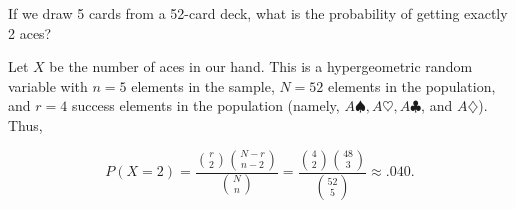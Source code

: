 \question If we draw 5 cards from a 52-card deck, what is the probability of
getting exactly 2 aces?


\begin{solution}
Let $X$ be the number of aces in our hand.  This is a hypergeometric random
variable with $n = 5$ elements in the sample, $N = 52$ elements in the
population, and $r = 4$ success elements in the population (namely,
$A\spadesuit, A\heartsuit, A\clubsuit$, and $A\diamondsuit$).  Thus,

\[
  P(X = 2)
    = \frac{\binom{r}{2} \binom{N - r}{n - 2}}{\binom{N}{n}}
    = \frac{\binom{4}{2} \binom{48}{3}}{\binom{52}{5}}
    \approx .040.
\]
\end{solution}



